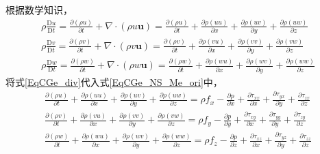 根据数学知识，
\begin{equation}
  \begin{aligned}
    \rho \frac{\mathrm{D}u}{\mathrm{D}t}
    =
    \frac{\partial (\rho u)}{\partial t}
    +
    \nabla\cdot(\rho u\mathbf{u})
    =
    \frac{\partial (\rho u)}{\partial t}
    +
    \frac{\partial \rho (uu)}{\partial x}
    +
    \frac{\partial \rho (uv)}{\partial y}
    +
    \frac{\partial \rho (uw)}{\partial z}
    \\
    \rho \frac{\mathrm{D}v}{\mathrm{D}t}
    =
    \frac{\partial (\rho v)}{\partial t}
    +
    \nabla\cdot(\rho v\mathbf{u})
    =
    \frac{\partial (\rho v)}{\partial t}
    +
    \frac{\partial \rho (vu)}{\partial x}
    +
    \frac{\partial \rho (vv)}{\partial y}
    +
    \frac{\partial \rho (vw)}{\partial z}
    \\
    \rho \frac{\mathrm{D}w}{\mathrm{D}t}
    =
    \frac{\partial (\rho w)}{\partial t}
    +
    \nabla\cdot(\rho w\mathbf{u})
    =
    \frac{\partial (\rho w)}{\partial t}
    +
    \frac{\partial \rho (wu)}{\partial x}
    +
    \frac{\partial \rho (wv)}{\partial y}
    +
    \frac{\partial \rho (ww)}{\partial z}
  \end{aligned}
  \label{EqCGe_div}
\end{equation}
将式\eqref{EqCGe_div}代入式\eqref{EqCGe_NS_Me_ori}中，
\begin{equation}
  \begin{aligned}
    \frac{\partial (\rho u)}{\partial t}
    +
    \frac{\partial \rho (uu)}{\partial x}
    +
    \frac{\partial \rho (uv)}{\partial y}
    +
    \frac{\partial \rho (uw)}{\partial z}
    =
    \rho f_{x}
    -\frac{\partial p}{\partial x}
    +\frac{\partial \tau_{xx}}{\partial x}
    +\frac{\partial \tau_{yx}}{\partial y}
    +\frac{\partial \tau_{zx}}{\partial z}
    \\
    \frac{\partial (\rho v)}{\partial t}
    +
    \frac{\partial \rho (vu)}{\partial x}
    +
    \frac{\partial \rho (vv)}{\partial y}
    +
    \frac{\partial \rho (vw)}{\partial z}
    =
    \rho f_{y}
    -\frac{\partial p}{\partial y}
    +\frac{\partial \tau_{xy}}{\partial x}
    +\frac{\partial \tau_{yy}}{\partial y}
    +\frac{\partial \tau_{zy}}{\partial z}
    \\
    \frac{\partial (\rho w)}{\partial t}
    +
    \frac{\partial \rho (wu)}{\partial x}
    +
    \frac{\partial \rho (wv)}{\partial y}
    +
    \frac{\partial \rho (ww)}{\partial z}
    =
    \rho f_{z}
    -\frac{\partial p}{\partial z}
    +\frac{\partial \tau_{xz}}{\partial x}
    +\frac{\partial \tau_{yz}}{\partial y}
    +\frac{\partial \tau_{zz}}{\partial z}
  \end{aligned}
  \label{EqCGe_NS_Me_general}
\end{equation}
